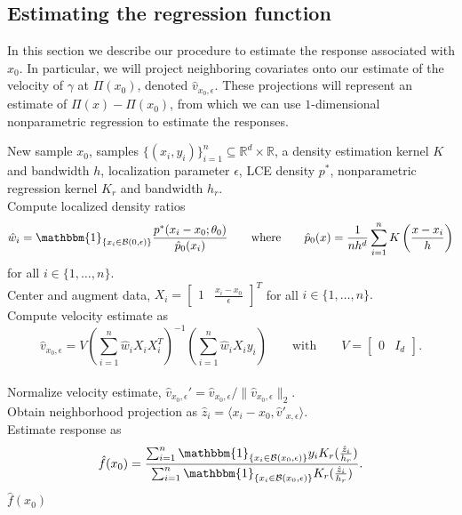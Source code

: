 \documentclass[11pt]{article}
\begin{document}
\subsection{Estimating the regression function}

In this section we describe our procedure to estimate the response associated with $x_0$. In particular, we will project neighboring covariates onto our estimate of the velocity of $\gamma$ at $\Pi(x_0)$, denoted $\hat v_{x_0, \epsilon}$. These projections will represent an estimate of $\Pi(x) - \Pi(x_0)$, from which we can use $1$-dimensional nonparametric regression to estimate the responses.

\begin{algorithm}[h]
    \begin{algorithmic}[1]
        \caption{Locally Linear Single Index Regression (LLSIR)}
        \label{alg: LLSIR}
        \Require New sample $x_0$, samples $\{(x_i, y_i)\}_{i=1}^n \subseteq \mathbb{R}^d \times \mathbb{R}$, a density estimation kernel $K$ and bandwidth $h$, localization parameter $\epsilon$, LCE density $p^*$, nonparametric regression kernel $K_r$ and bandwidth $h_r$.\\
        Compute localized density ratios \[\hat{w}_i = \mathbbm{1}_{\{x_i \in \mathcal{B}(0, \epsilon)\}}\frac{p^*(x_i - x_0; \theta_0)}{\hat p_0(x_i)} \qquad \text{where} \qquad \hat p_0(x) = \frac{1}{nh^d}\sum_{i = 1}^nK\left(\frac{x -x_i}{h}\right)\]for all $i \in \{1, \dots, n\}$. \\
        Center and augment data, $X_i = \begin{bmatrix}
            1 & \frac{x_i - x_0}{\epsilon}
        \end{bmatrix}^T$ for all $i \in \{1, \dots , n\}.$ \\
        Compute velocity estimate as 
        \[ \hat{v}_{x_0, \epsilon} = V\left(\sum_{i = 1}^n\hat{w}_iX_iX_i^T\right)^{-1}\left(\sum_{i = 1}^n\hat{w}_iX_iy_i\right) \qquad \text{with} \qquad V = \begin{bmatrix}
            0 & I_d
        \end{bmatrix}.\] \\
        Normalize velocity estimate, $\hat v_{x_0, \epsilon}' = \hat v_{x_0, \epsilon} /\|\hat v_{x_0, \epsilon}\|_2$.\\
        Obtain neighborhood projection as $\hat{z}_i = \langle x_i - x_0, \hat{v}'_{x, \epsilon} \rangle$. \\
        Estimate response as 
        \begin{equation} \label{eq: kernel regressor}
            \hat{f}(x_0) = \frac{\sum_{i=1}^n \mathbbm{1}_{\{x_i\in \mathcal{B}(x_0, \epsilon)\}}y_iK_r(\frac{\hat{z}_i}{h_r})}{\sum_{i=1}^n \mathbbm{1}_{\{x_i\in \mathcal{B}(x_0, \epsilon)\}}K_r(\frac{\hat{z}_i}{h_r})}.
        \end{equation}
        \Return $\hat{f}(x_0)$
    \end{algorithmic}
\end{algorithm}
\end{document}
